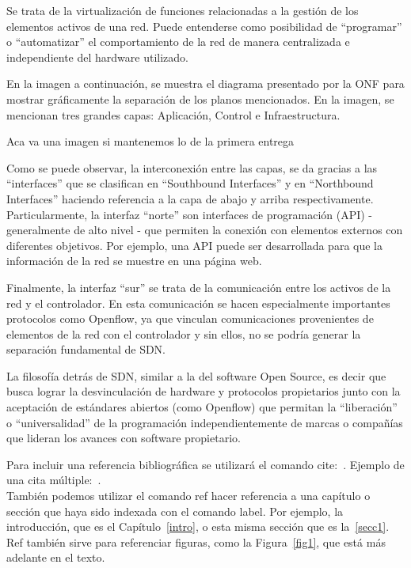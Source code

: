 \documentclass[12pt,a4paper,oneside]{book}
\begin{document}
Se trata de la virtualización de funciones relacionadas a la gestión de los elementos activos de una red. Puede entenderse como posibilidad de “programar” o “automatizar” el comportamiento de la red de manera centralizada e independiente del hardware utilizado. 

En la imagen a continuación, se muestra el diagrama presentado por la ONF para mostrar gráficamente la separación de los planos mencionados. En la imagen, se mencionan tres grandes capas: Aplicación, Control e Infraestructura. 

Aca va una imagen si mantenemos lo de la primera entrega

Como se puede observar, la interconexión entre las capas, se da gracias a las “interfaces” que se clasifican en “Southbound Interfaces” y en “Northbound Interfaces” haciendo referencia a la capa de abajo y arriba respectivamente.
	Particularmente, la interfaz “norte” son interfaces de programación (API) - generalmente de alto nivel - que permiten la conexión con elementos externos con diferentes objetivos. Por ejemplo, una API puede ser desarrollada para que la información de la red se muestre en una página web.
	
Finalmente, la interfaz “sur” se trata de la comunicación entre los activos de la red y el controlador. En esta comunicación se hacen especialmente importantes protocolos como Openflow, ya que vinculan comunicaciones provenientes de elementos de la red con el controlador y sin ellos, no se podría generar la separación fundamental de SDN.
	
La filosofía detrás de SDN, similar a la del software Open Source, es decir que busca lograr la desvinculación de hardware y protocolos propietarios junto con la aceptación de estándares abiertos (como Openflow) que permitan la “liberación” o “universalidad” de la programación independientemente de marcas o compañías que lideran los avances con software propietario. 





Para incluir una referencia bibliográfica se utilizará el comando cite:~\cite{girard1989}.
Ejemplo de una cita múltiple:~\cite{ranta2012,tcs2015}.\\

También podemos utilizar el comando ref hacer referencia a una capítulo o sección que haya sido indexada con el comando label. Por ejemplo, la introducción, que es el Capítulo~\ref{intro}, o esta misma sección que es la~\ref{secc1}. Ref también sirve para referenciar figuras, como la Figura~\ref{fig1}, que está más adelante en el texto.
\end{document}
